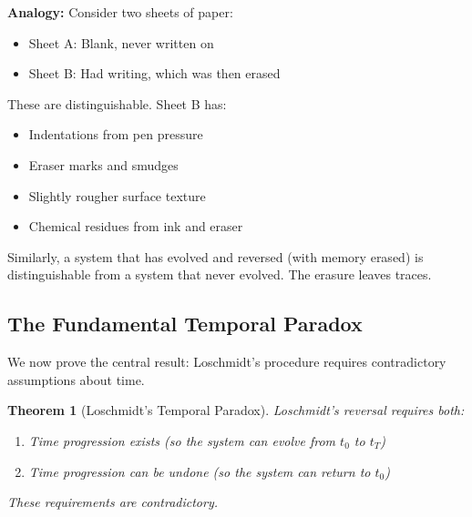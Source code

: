 \documentclass[twocolumn,10pt]{article}
\newtheorem{theorem}{Theorem}[section]
\theoremstyle{definition}
\theoremstyle{remark}
\begin{document}
\vspace{0.2cm}
\noindent\textbf{Analogy:} Consider two sheets of paper:
\begin{itemize}
\item Sheet A: Blank, never written on
\item Sheet B: Had writing, which was then erased
\end{itemize}

These are distinguishable. Sheet B has:
\begin{itemize}
\item Indentations from pen pressure
\item Eraser marks and smudges
\item Slightly rougher surface texture
\item Chemical residues from ink and eraser
\end{itemize}

Similarly, a system that has evolved and reversed (with memory erased) is distinguishable from a system that never evolved. The erasure leaves traces.

\subsection{The Fundamental Temporal Paradox}

We now prove the central result: Loschmidt's procedure requires contradictory assumptions about time.

\begin{theorem}[Loschmidt's Temporal Paradox]
\label{thm:temporal_paradox}
Loschmidt's reversal requires both:
\begin{enumerate}
\item Time progression exists (so the system can evolve from $t_0$ to $t_T$)
\item Time progression can be undone (so the system can return to $t_0$)
\end{enumerate}
These requirements are contradictory.
\end{theorem}
\end{document}
